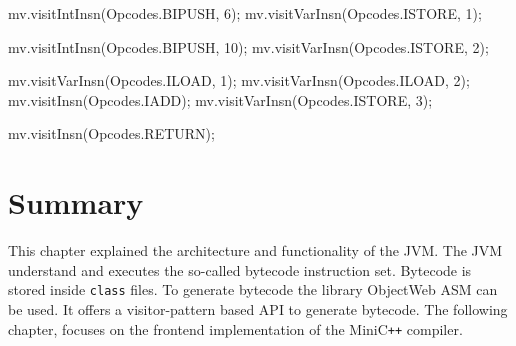 \begin{JavaCode}[float,numbers=none,caption=ASM code for bytecode generation of the Java program shown in listing \ref{lst:JavaNumberAdd}., label=lst:JavaNumberAddASM]
mv.visitIntInsn(Opcodes.BIPUSH, 6);
mv.visitVarInsn(Opcodes.ISTORE, 1); 

mv.visitIntInsn(Opcodes.BIPUSH, 10);
mv.visitVarInsn(Opcodes.ISTORE, 2); 


mv.visitVarInsn(Opcodes.ILOAD, 1); 
mv.visitVarInsn(Opcodes.ILOAD, 2); 
mv.visitInsn(Opcodes.IADD);        
mv.visitVarInsn(Opcodes.ISTORE, 3);

mv.visitInsn(Opcodes.RETURN);
\end{JavaCode}

\section{Summary}

This chapter explained the architecture and functionality of the JVM. The JVM understand and executes the so-called bytecode instruction set. Bytecode is stored inside \verb|class| files. To generate bytecode the library ObjectWeb ASM can be used. It offers a visitor-pattern based API to generate bytecode. The following chapter, focuses on the frontend implementation of the MiniC\verb|++| compiler.